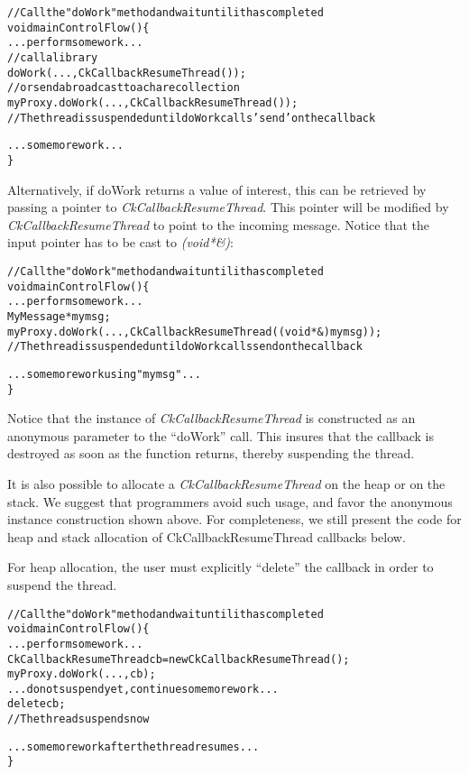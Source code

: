\begin{alltt}
// Call the "doWork" method and wait until it has completed
void mainControlFlow() \{
  ...perform some work...
  // call a library
  doWork(...,CkCallbackResumeThread());
  // or send a broadcast to a chare collection
  myProxy.doWork(...,CkCallbackResumeThread());
  // The thread is suspended until doWork calls 'send' on the callback
  
  ...some more work...
\}
\end{alltt}

Alternatively, if doWork returns a value of interest, this can be retrieved by
passing a pointer to {\em CkCallbackResumeThread}. This pointer will be modified
by {\em CkCallbackResumeThread} to point to the incoming message. Notice that
the input pointer has to be cast to {\em (void*\&)}:

\begin{alltt}
// Call the "doWork" method and wait until it has completed
void mainControlFlow() \{
  ...perform some work...
  MyMessage *mymsg;
  myProxy.doWork(...,CkCallbackResumeThread((void*\&)mymsg));
  // The thread is suspended until doWork calls send on the callback

  ...some more work using "mymsg"...
\}
\end{alltt}

Notice that the instance of {\em CkCallbackResumeThread} is constructed
as an anonymous parameter to the ``doWork'' call. This insures that the callback
is destroyed as soon as the function returns, thereby suspending the thread.

It is also possible to allocate a {\em CkCallbackResumeThread} on the heap or on
the stack. We suggest that programmers avoid such usage, and favor the anonymous instance construction
shown above. For completeness, we still present the code for heap and stack
allocation of CkCallbackResumeThread callbacks below.

For heap allocation, the user must explicitly ``delete'' the callback in order to
suspend the thread.

\begin{alltt}
// Call the "doWork" method and wait until it has completed
void mainControlFlow() \{
  ...perform some work...
  CkCallbackResumeThread cb = new CkCallbackResumeThread();
  myProxy.doWork(...,cb);
  ...do not suspend yet, continue some more work...
  delete cb;
  // The thread suspends now

  ...some more work after the thread resumes...
\}
\end{alltt}


